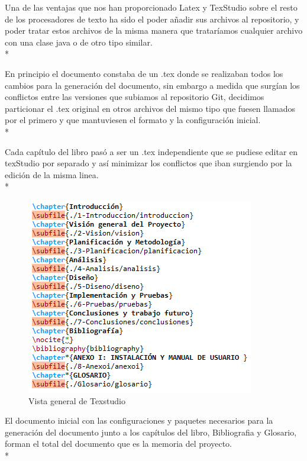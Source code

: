 \documentclass[../pfc.tex]{subfiles}
\begin{document}
	Una de las ventajas que nos han proporcionado Latex y TexStudio sobre el resto de los procesadores de texto ha sido el poder añadir sus archivos al repositorio, y poder tratar estos archivos de la misma manera que trataríamos cualquier archivo con una clase java o de otro tipo similar.\\*
	
	En principio el documento constaba de un .tex donde se realizaban todos los cambios para la generación del documento, sin embargo a medida que surgían los conflictos entre las versiones que subiamos al repositorio Git, decidimos particionar el .tex original en otros archivos del mismo tipo que fuesen llamados por el primero y que mantuviesen el formato y la configuración inicial.\\*
	
	Cada capítulo del libro pasó a ser un .tex independiente que se pudiese editar en texStudio por separado y así minimizar los conflictos que iban surgiendo por la edición de la misma linea.\\*
	
	\begin{figure}[H]
		\centering
		\includegraphics[width=0.5\linewidth]{../images/texstudiochapters}
		\caption{Vista general de Texstudio}
		\label{fig:texstudioCHAP}
	\end{figure}
	
	El documento inicial con las configuraciones y paquetes necesarios para la generación del documento junto a los capítulos del libro, Bibliografia y Glosario, forman el total del documento que es la memoria del proyecto.\\*
	
	

	
\end{document}
